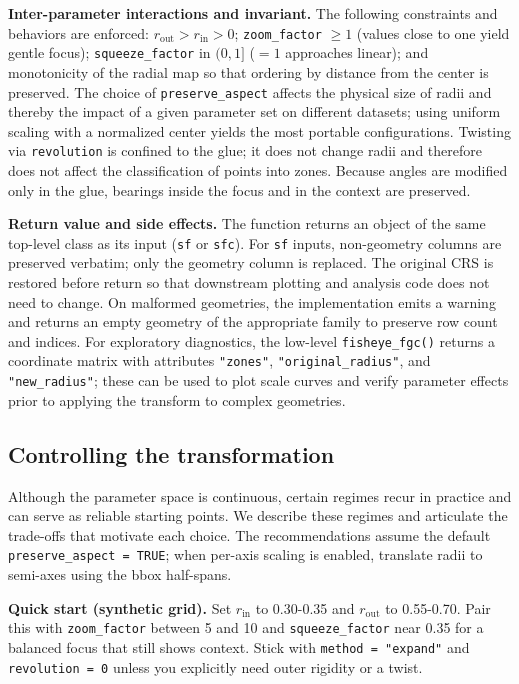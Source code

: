 \textbf{Inter-parameter interactions and invariant.} The following constraints and behaviors are enforced: \(r_{\text{out}} > r_{\text{in}} > 0\); \texttt{zoom\_factor} \(\ge 1\) (values close to one yield gentle focus); \texttt{squeeze\_factor} in \((0,1]\) (\(=1\) approaches linear); and monotonicity of the radial map so that ordering by distance from the center is preserved. The choice of \texttt{preserve\_aspect} affects the physical size of radii and thereby the impact of a given parameter set on different datasets; using uniform scaling with a normalized center yields the most portable configurations. Twisting via \texttt{revolution} is confined to the glue; it does not change radii and therefore does not affect the classification of points into zones. Because angles are modified only in the glue, bearings inside the focus and in the context are preserved.

\textbf{Return value and side effects.} The function returns an object of the same top-level class as its input (\texttt{sf} or \texttt{sfc}). For \texttt{sf} inputs, non-geometry columns are preserved verbatim; only the geometry column is replaced. The original CRS is restored before return so that downstream plotting and analysis code does not need to change. On malformed geometries, the implementation emits a warning and returns an empty geometry of the appropriate family to preserve row count and indices. For exploratory diagnostics, the low-level \texttt{fisheye\_fgc()} returns a coordinate matrix with attributes \texttt{"zones"}, \texttt{"original\_radius"}, and \texttt{"new\_radius"}; these can be used to plot scale curves and verify parameter effects prior to applying the transform to complex geometries.

\subsection{Controlling the transformation}\label{controlling-the-transformation}

Although the parameter space is continuous, certain regimes recur in practice and can serve as reliable starting points. We describe these regimes and articulate the trade-offs that motivate each choice. The recommendations assume the default \texttt{preserve\_aspect\ =\ TRUE}; when per-axis scaling is enabled, translate radii to semi-axes using the bbox half-spans.

\textbf{Quick start (synthetic grid).} Set \(r_{\text{in}}\) to 0.30-0.35 and \(r_{\text{out}}\) to 0.55-0.70. Pair this with \texttt{zoom\_factor} between 5 and 10 and \texttt{squeeze\_factor} near 0.35 for a balanced focus that still shows context. Stick with \texttt{method\ =\ "expand"} and \texttt{revolution\ =\ 0} unless you explicitly need outer rigidity or a twist.

